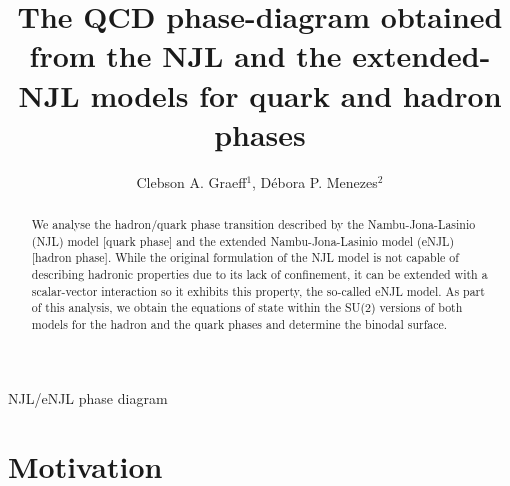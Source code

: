 \documentclass{ws-ijmpcs}
\begin{document}
{NJL/eNJL phase diagram}

%
\catchline{}{}{}{}{}
%

\title{The QCD phase-diagram obtained from the NJL and the extended-NJL models for quark and hadron phases}

\author{Clebson A. Graeff$^1$, D\'ebora P. Menezes$^2$}

\address{$^1$Departamento de F\'isica, Universidade Tecnol\'ogica Federal do Paran\'a \\
Via do Conhecimento, Km 1 CEP 85503-390, Pato Branco, Paran\'a, Brazil \\
\vspace{2mm}
$^{1,2}$Departamento de F\'isica, Universidade Federal de Santa Catarina \\
Florian\'opolis, SC, CP 476, CEP 88.040-900, Brazil\\
\vspace{2mm}
$^1$cgraeff@utfpr.edu.br\\
$^2$debora.p.m@ufsc.br}

\maketitle

\begin{history}
\end{history}

\begin{abstract}
We analyse the hadron/quark phase transition described by the Nambu-Jona-Lasinio (NJL) model [quark phase] and the extended Nambu-Jona-Lasinio model (eNJL) [hadron phase]. While the original formulation of the NJL model is not capable of describing hadronic properties due to its lack of confinement, it can be extended with a scalar-vector interaction so it exhibits this property, the so-called  eNJL model. As part of this analysis, we obtain the equations of state within the SU(2) versions of both models for the hadron and the quark phases and determine the binodal surface. 
\end{abstract}


\section{Motivation}
\end{document}
